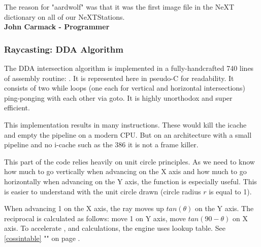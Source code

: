  \begin{fancyquotes}
The reason for "aardwolf" was that it was the first image file in the NeXT dictionary on all of our NeXTStations.
\bigskip \\
\textbf{John Carmack - Programmer}
 \end{fancyquotes}













 
 
 
 
 
 
 
 
\subsubsection{Raycasting: DDA Algorithm}
The DDA intersection algorithm is implemented in a fully-handcrafted 740 lines of assembly routine: . It is represented here in pseudo-C for readability. It consists of two while loops (one each for vertical and horizontal intersections) ping-ponging with each other via goto. It is highly unorthodox and super efficient.\\
\par



\begin{minipage}{\textwidth}

\end{minipage}
This implementation results in many  instructions. These would kill the icache and empty the pipeline on a modern CPU. But on an architecture with a small pipeline and no i-cache such as the 386 it is not a frame killer.\\
\par
This part of the code relies heavily on unit circle principles. As we need to know how much to go vertically when advancing on the X axis and how much to go horizontally when advancing on the Y axis, the  function is especially useful. This is easier to understand with the unit circle drawn (circle radius $r$ is equal to 1).
\label{unit_circle}
\par
When advancing 1 on the X axis, the ray moves up $tan(\theta)$ on the Y axis. The reciprocal is calculated as follows: move 1 on Y axis, move $tan(90-\theta)$ on X axis. To accelerate ,  and  calculations, the engine uses lookup table. See \ref{cossintable} "" on page \pageref{cossintable}.




















